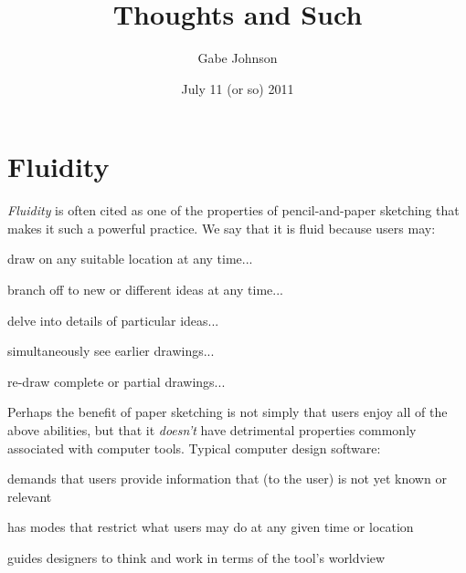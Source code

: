 \documentclass[12pt]{article}
\title{Thoughts and Such}
\author{Gabe Johnson}
\date{July 11 (or so) 2011} %
\newenvironment{packed_enum}{
\begin{enumerate}
  \setlength{\itemsep}{1pt}
  \setlength{\parskip}{0pt}
  \setlength{\parsep}{0pt}
}{\end{enumerate}}
\begin{document}
\maketitle



\section{Fluidity}
\textit{Fluidity} is often cited as one of the properties of
pencil-and-paper sketching that makes it such a powerful practice. We
say that it is fluid because users may:

\begin{packed_enum}
\item draw on any suitable location at any time...
\item branch off to new or different ideas at any time...
\item delve into details of particular ideas...
\item simultaneously see earlier drawings...
\item re-draw complete or partial drawings...
\end{packed_enum}

Perhaps the benefit of paper sketching is not simply that users enjoy
all of the above abilities, but that it \textit{doesn't} have
detrimental properties commonly associated with computer
tools. Typical computer design software:

\begin{packed_enum}
\item demands that users provide information that (to the user) is not
  yet known or relevant
\item has modes that restrict what users may do at any given time or
  location
\item guides designers to think and work in terms of the tool's
  worldview
\end{packed_enum}
\end{document}
